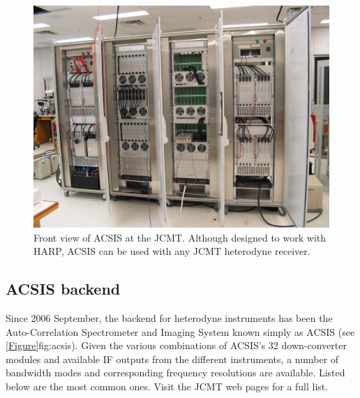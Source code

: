 \documentclass[11pt,oneside,chapters]{starlink}
\begin{document}
\begin{figure}[b!]
\begin{center}
\includegraphics[width=0.7\linewidth]{sc20_acsis_front_sm}
\caption[Front view of ACSIS at the JCMT]{\label{fig:acsis}
  Front view of ACSIS at the JCMT. Although designed to work with HARP,
  ACSIS can be used with any JCMT heterodyne receiver.}
\end{center}
\end{figure}


\subsection{ACSIS backend}

Since 2006 September, the backend for heterodyne instruments has been the
Auto-Correlation Spectrometer and Imaging System known simply as ACSIS
(see \cref{Figure}{fig:acsis}{}). Given the various combinations of
ACSIS's 32 down-converter modules and available IF outputs from the
different instruments, a number of bandwidth modes and corresponding
frequency resolutions are available. Listed below are the most common
ones. Visit the JCMT web pages for a full list.
\end{document}
